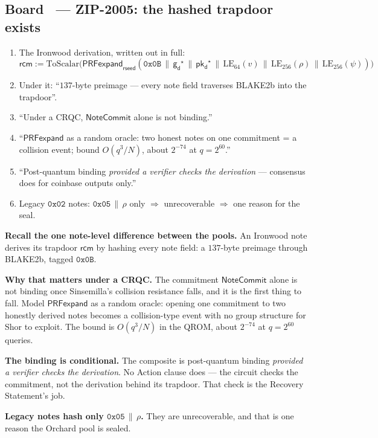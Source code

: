 \documentclass[11pt,a4paper]{article}
\makeatletter
\newcommand{\gd}{\ensuremath{\mathsf{g_d}}}
\newcommand{\pkd}{\ensuremath{\mathsf{pk_d}}}
\newcommand{\rcm}{\ensuremath{\mathsf{rcm}}}
\newcommand{\NoteCommit}{\ensuremath{\mathsf{NoteCommit}}}
\newcounter{board}
\newenvironment{board}[2]{\stepcounter{board}%
  \subsection*{Board \theboard\ --- #1 \hfill {\normalfont\small\color{arb}#2}}}{\medskip}
\newcommand{\Write}{\draw@head{Write}}
\newcommand{\Say}{\draw@head{Say}}
\makeatother
\begin{document}
\begin{board}{ZIP-2005: the hashed trapdoor}{exists}
\Write
\begin{enumerate}
  \item The Ironwood derivation, written out in full:
    \[
    \rcm := \mathrm{ToScalar}\bigl(\mathsf{PRFexpand}_{\mathsf{rseed}}(
    \mathtt{0x0B} \,\|\, \gd^\star \,\|\, \pkd^\star \,\|\,
    \mathrm{LE}_{64}(v) \,\|\, \mathrm{LE}_{256}(\rho) \,\|\,
    \mathrm{LE}_{256}(\psi))\bigr)
    \]
  \item Under it: ``$137$-byte preimage --- every note field traverses
    BLAKE2b into the trapdoor''.
  \item ``Under a CRQC, \NoteCommit{} alone is not binding.''
  \item ``$\mathsf{PRFexpand}$ as a random oracle: two honest notes on
    one commitment = a collision event; bound $O(q^3/N)$, about
    $2^{-74}$ at $q = 2^{60}$.''
  \item ``Post-quantum binding \emph{provided a verifier checks the
    derivation} --- consensus does for coinbase outputs only.''
  \item Legacy $\mathtt{0x02}$ notes: $\mathtt{0x05} \,\|\, \rho$ only
    $\Rightarrow$ unrecoverable $\Rightarrow$ one reason for the seal.
\end{enumerate}
\Say
\textbf{Recall the one note-level difference between the pools.} An
Ironwood note derives its trapdoor \rcm{} by hashing every note field:
a $137$-byte preimage through BLAKE2b, tagged $\mathtt{0x0B}$.

\textbf{Why that matters under a CRQC.} The commitment \NoteCommit{}
alone is not binding once Sinsemilla's collision resistance falls, and
it is the first thing to fall. Model $\mathsf{PRFexpand}$ as a random oracle:
opening one commitment to two honestly derived notes becomes a
collision-type event with no group structure for Shor to exploit. The
bound is $O(q^3/N)$ in the QROM, about $2^{-74}$ at $q = 2^{60}$
queries.

\textbf{The binding is conditional.} The composite is post-quantum
binding \emph{provided a verifier checks the derivation}. No Action
clause does --- the circuit checks the commitment, not the derivation
behind its trapdoor. That check is the Recovery Statement's job.

\textbf{Legacy notes hash only $\mathtt{0x05} \,\|\, \rho$.} They are
unrecoverable, and that is one reason the Orchard pool is sealed.


\end{board}
\end{document}
